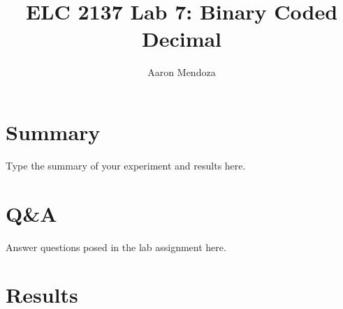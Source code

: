 \documentclass[11pt]{article}
\begin{document}
\title{ELC 2137 Lab 7: Binary Coded Decimal}
\author{Aaron Mendoza}

\maketitle


\section*{Summary}

Type the summary of your experiment and results here.  


\section*{Q\&A}

Answer questions posed in the lab assignment here.


\section*{Results}
\end{document}
